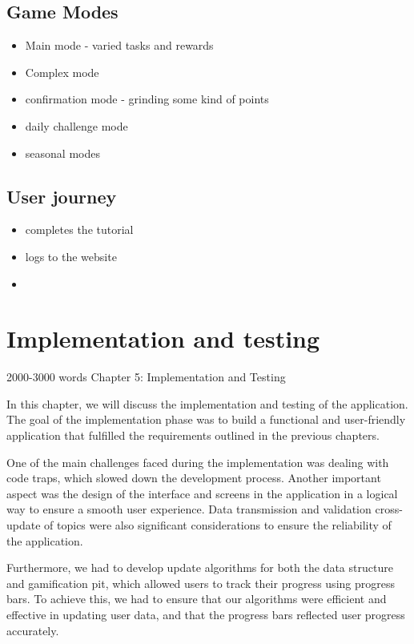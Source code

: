 \documentclass{article}
\begin{document}
\subsection{Game Modes}
\begin{itemize}
  \item Main mode - varied tasks and rewards
  \item Complex mode
  \item confirmation mode - grinding some kind of points
  \item daily challenge mode
  \item seasonal modes
\end{itemize}

\subsection{User journey}
\begin{itemize}
  \item completes the tutorial
  \item logs to the website
  \item 
\end{itemize}
\blindtext
\newpage

\section{Implementation and testing} 2000-3000 words
Chapter 5: Implementation and Testing

In this chapter, we will discuss the implementation and testing of the application. The goal of the implementation phase was to build a functional and user-friendly application that fulfilled the requirements outlined in the previous chapters.

One of the main challenges faced during the implementation was dealing with code traps, which slowed down the development process. Another important aspect was the design of the interface and screens in the application in a logical way to ensure a smooth user experience. Data transmission and validation cross-update of topics were also significant considerations to ensure the reliability of the application.

Furthermore, we had to develop update algorithms for both the data structure and gamification pit, which allowed users to track their progress using progress bars. To achieve this, we had to ensure that our algorithms were efficient and effective in updating user data, and that the progress bars reflected user progress accurately.
\end{document}
